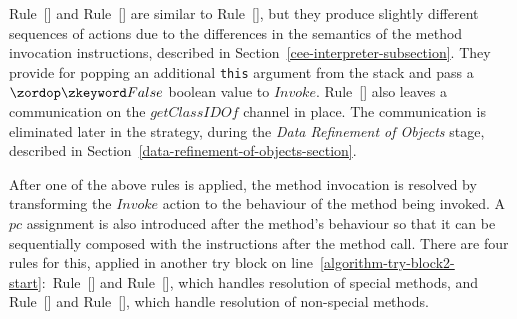 Rule~[] and
Rule~[] are similar to
Rule~[], but they produce slightly
different sequences of actions due to the differences in the semantics
of the method invocation instructions, described in
Section~\ref{cee-interpreter-subsection}.
They provide for popping an additional \texttt{this} argument from the
stack and pass a $\false$ boolean value to $Invoke$.
Rule~[] also leaves a
communication on the $getClassIDOf$ channel in place.
The communication is eliminated later in the strategy, during the
\emph{Data Refinement of Objects} stage, described in
Section~\ref{data-refinement-of-objects-section}.

After one of the above rules is applied, the method invocation is
resolved by transforming the $Invoke$ action to the behaviour of the
method being invoked.
A $pc$ assignment is also introduced after the method's behaviour so
that it can be sequentially composed with the instructions after the
method call.
There are four rules for this, applied in another try block on
line~\ref{algorithm-try-block2-start}:~Rule~[]
and Rule~[], which
handles resolution of special methods, and
Rule~[] and
Rule~[], which handle
resolution of non-special methods.

